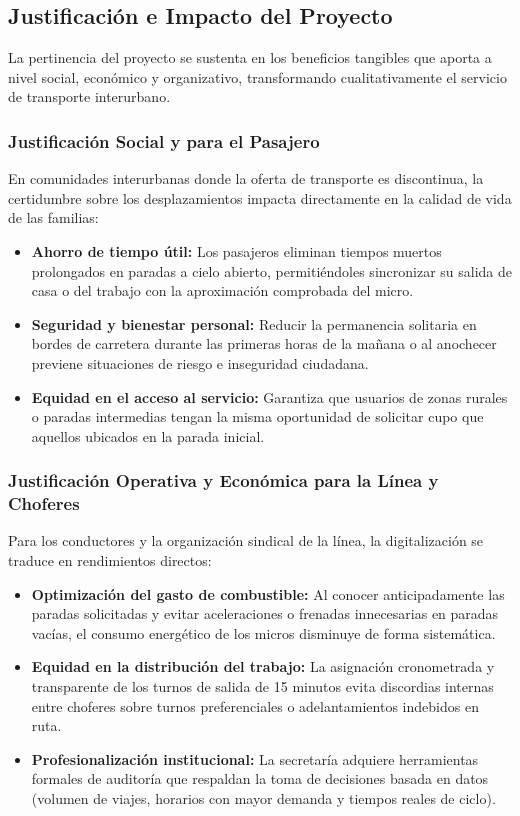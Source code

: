 \subsection{Justificación e Impacto del Proyecto}

La pertinencia del proyecto se sustenta en los beneficios tangibles que aporta a nivel social, económico y organizativo, transformando cualitativamente el servicio de transporte interurbano.

\subsubsection{Justificación Social y para el Pasajero}

En comunidades interurbanas donde la oferta de transporte es discontinua, la certidumbre sobre los desplazamientos impacta directamente en la calidad de vida de las familias:

\begin{itemize}
    \item \textbf{Ahorro de tiempo útil:} Los pasajeros eliminan tiempos muertos prolongados en paradas a cielo abierto, permitiéndoles sincronizar su salida de casa o del trabajo con la aproximación comprobada del micro.
    \item \textbf{Seguridad y bienestar personal:} Reducir la permanencia solitaria en bordes de carretera durante las primeras horas de la mañana o al anochecer previene situaciones de riesgo e inseguridad ciudadana.
    \item \textbf{Equidad en el acceso al servicio:} Garantiza que usuarios de zonas rurales o paradas intermedias tengan la misma oportunidad de solicitar cupo que aquellos ubicados en la parada inicial.
\end{itemize}

\subsubsection{Justificación Operativa y Económica para la Línea y Choferes}

Para los conductores y la organización sindical de la línea, la digitalización se traduce en rendimientos directos:

\begin{itemize}
    \item \textbf{Optimización del gasto de combustible:} Al conocer anticipadamente las paradas solicitadas y evitar aceleraciones o frenadas innecesarias en paradas vacías, el consumo energético de los micros disminuye de forma sistemática.
    \item \textbf{Equidad en la distribución del trabajo:} La asignación cronometrada y transparente de los turnos de salida de 15 minutos evita discordias internas entre choferes sobre turnos preferenciales o adelantamientos indebidos en ruta.
    \item \textbf{Profesionalización institucional:} La secretaría adquiere herramientas formales de auditoría que respaldan la toma de decisiones basada en datos (volumen de viajes, horarios con mayor demanda y tiempos reales de ciclo).
\end{itemize}

